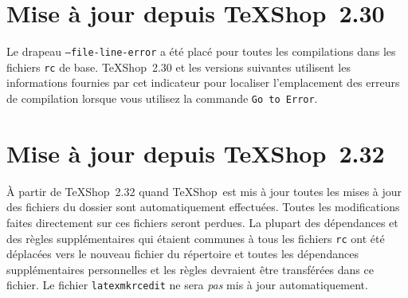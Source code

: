 \documentclass[11pt,french]{article}
\newcommand{\TS}{\textsf{\TeX Shop}}
\begin{document}
\section{Mise à jour depuis \TS\ 2.30}

Le drapeau \texttt{--file-line-error} a été placé pour toutes les compilations dans les fichiers \texttt{rc} de base. \TS\ 2.30 et les versions suivantes utilisent les informations fournies par cet indicateur pour localiser l'emplacement des erreurs de compilation lorsque vous utilisez la commande \texttt{Go to Error}.

%


\section{Mise à jour depuis \TS\ 2.32}

À partir de \TS\ 2.32 quand \TS\ est mis à jour toutes les mises à jour des fichiers du dossier  sont automatiquement effectuées. Toutes les modifications faites directement sur ces fichiers seront perdues. La plupart des dépendances et des règles supplémentaires qui étaient communes à tous les fichiers \texttt{rc} ont été déplacées vers le nouveau fichier du répertoire  et toutes les dépendances supplémentaires personnelles et les règles devraient être transférées dans ce fichier. Le fichier \texttt{latexmkrcedit} ne sera \emph{pas} mis à jour automatiquement.
\end{document}
